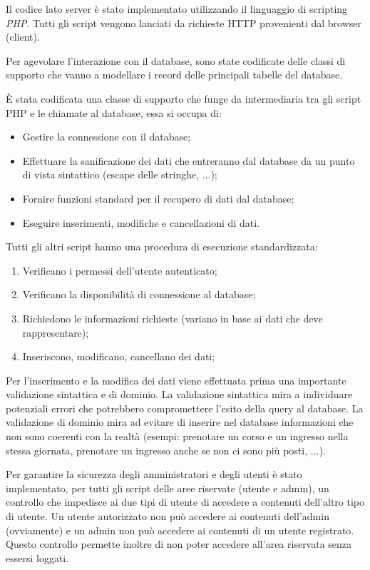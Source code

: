 Il codice lato server è stato implementato utilizzando il linguaggio di scripting \textit{PHP}. Tutti gli script vengono lanciati da richieste HTTP provenienti dal browser (client).

Per agevolare l'interazione con il database, sono state codificate delle classi di supporto che vanno a modellare i record delle principali tabelle del database. 

È stata codificata una classe di supporto che funge da intermediaria tra gli script PHP e le chiamate al database, essa si occupa di:
\begin{itemize}
\item Gestire la connessione con il database;
\item Effettuare la sanificazione dei dati che entreranno dal database da un punto di vista sintattico (escape delle stringhe, ...);
\item Fornire funzioni standard per il recupero di dati dal database;
\item Eseguire inserimenti, modifiche e cancellazioni di dati.
\end{itemize}

Tutti gli altri script hanno una procedura di esecuzione standardizzata:
\begin{enumerate}
\item Verificano i permessi dell'utente autenticato;
\item Verificano la disponibilità di connessione al database;
\item Richiedono le informazioni richieste (variano in base ai dati che deve rappresentare);
\item Inseriscono, modificano, cancellano dei dati;
\end{enumerate}

Per l'inserimento e la modifica dei dati viene effettuata prima una importante validazione sintattica e di dominio. La validazione sintattica mira a individuare potenziali errori che potrebbero compromettere l'esito della query al database. La validazione di dominio mira ad evitare di inserire nel database informazioni che non sono coerenti con la realtà (esempi: prenotare un corso e un ingresso nella stessa giornata, prenotare un ingresso anche se non ci sono più posti, ...).

Per garantire la sicurezza degli amministratori e degli utenti è stato implementato, per tutti gli script delle aree riservate (utente e admin), un controllo che impedisce ai due tipi di utente di accedere a contenuti dell'altro tipo di utente. Un utente autorizzato non può accedere ai contenuti dell'admin (ovviamente) e un admin non può accedere ai contenuti di un utente registrato. Questo controllo permette inoltre di non poter accedere all'area riservata senza essersi loggati.
